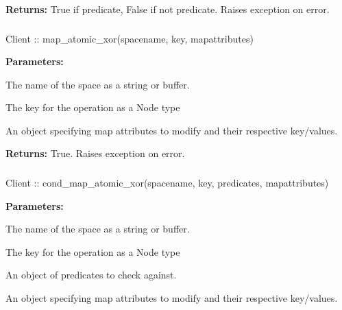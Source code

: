 \noindent\textbf{Returns:}
True if predicate, False if not predicate.  Raises exception on error.

\subsubsection{}
\label{api:nodejs:map_atomic_xor}
\begin{javascriptcode}
Client :: map_atomic_xor(spacename, key, mapattributes)
\end{javascriptcode}
\funcdesc 

\noindent\textbf{Parameters:}
\begin{description}[labelindent=\widthof{{\code{mapattributes}}},leftmargin=*,noitemsep,nolistsep,align=right]
\item[\code{spacename}] The name of the space as a string or buffer.
\item[\code{key}] The key for the operation as a Node type
\item[\code{mapattributes}] An object specifying map attributes to modify and their respective key/values.
\end{description}

\noindent\textbf{Returns:}
True.  Raises exception on error.

\subsubsection{}
\label{api:nodejs:cond_map_atomic_xor}
\begin{javascriptcode}
Client :: cond_map_atomic_xor(spacename, key, predicates, mapattributes)
\end{javascriptcode}
\funcdesc 

\noindent\textbf{Parameters:}
\begin{description}[labelindent=\widthof{{\code{mapattributes}}},leftmargin=*,noitemsep,nolistsep,align=right]
\item[\code{spacename}] The name of the space as a string or buffer.
\item[\code{key}] The key for the operation as a Node type
\item[\code{predicates}] An object of predicates to check against.
\item[\code{mapattributes}] An object specifying map attributes to modify and their respective key/values.
\end{description}


